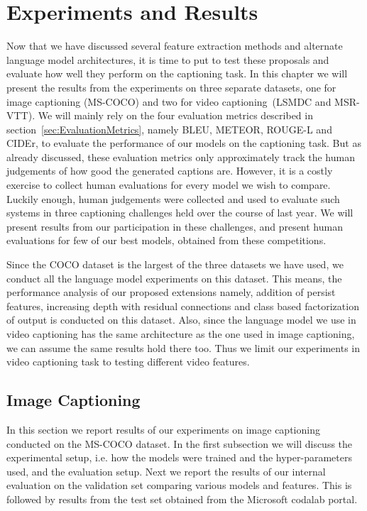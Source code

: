 \chapter{Experiments and Results}
\label{chapter:results}

Now that we have discussed several feature extraction methods and alternate
language model architectures, it is time to put to test these proposals and
evaluate how well they perform on the captioning task.
In this chapter we will present the results from the experiments on three
separate datasets, one for image captioning (MS-COCO) and two for video
captioning~(LSMDC and MSR-VTT).
We will mainly rely on the four evaluation metrics described in
section~\ref{sec:EvaluationMetrics}, namely BLEU, METEOR, ROUGE-L and CIDEr, to
evaluate the performance of our models on the captioning task.
But as already discussed, these evaluation metrics only approximately track the
human judgements of how good the generated captions are.
However, it is a costly exercise to collect human evaluations for every model we
wish to compare.
Luckily enough, human judgements were collected and used to evaluate such
systems in three captioning challenges held over the course of last year.
We will present results from our participation in these challenges, and present
human evaluations for few of our best models, obtained from these competitions.

Since the COCO dataset is the largest of the three datasets we have used, we
conduct all the language model experiments on this dataset.
This means, the performance analysis of our proposed extensions namely, addition
of persist features, increasing depth with residual connections and class based
factorization of output is conducted on this dataset.
Also, since the language model we use in video captioning has the same
architecture as the one used in image captioning, we can assume the same results
hold there too.
Thus we limit our experiments in video captioning task to testing different
video features.


\section{Image Captioning}

In this section we report results of our experiments on image captioning
conducted on the MS-COCO dataset.
In the first subsection we will discuss the experimental setup, i.e. how the
models were trained and the hyper-parameters used, and the evaluation setup.
Next we report the results of our internal evaluation on the validation set
comparing various models and features.
This is followed by results from the test set obtained from the Microsoft
codalab portal.

